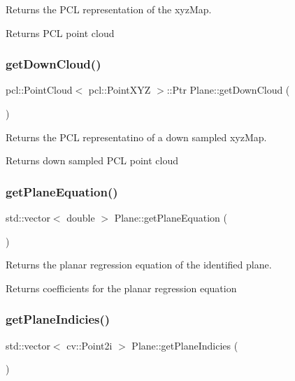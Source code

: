 Returns the P\+CL representation of the xyz\+Map. 

\begin{DoxyReturn}{Returns}
P\+CL point cloud 
\end{DoxyReturn}
\hypertarget{class_plane_abad6f7c26005ad7ab847af5acaad9c31}{}\label{class_plane_abad6f7c26005ad7ab847af5acaad9c31} 
\subsubsection{\texorpdfstring{get\+Down\+Cloud()}{getDownCloud()}}
{\footnotesize\ttfamily pcl\+::\+Point\+Cloud$<$ pcl\+::\+Point\+X\+YZ $>$\+::Ptr Plane\+::get\+Down\+Cloud (\begin{DoxyParamCaption}{ }\end{DoxyParamCaption})}



Returns the P\+CL representatino of a down sampled xyz\+Map. 

\begin{DoxyReturn}{Returns}
down sampled P\+CL point cloud 
\end{DoxyReturn}
\hypertarget{class_plane_aafedb091ba358d46d5203c4e0eb6e838}{}\label{class_plane_aafedb091ba358d46d5203c4e0eb6e838} 
\subsubsection{\texorpdfstring{get\+Plane\+Equation()}{getPlaneEquation()}}
{\footnotesize\ttfamily std\+::vector$<$ double $>$ Plane\+::get\+Plane\+Equation (\begin{DoxyParamCaption}{ }\end{DoxyParamCaption})}



Returns the planar regression equation of the identified plane. 

\begin{DoxyReturn}{Returns}
coefficients for the planar regression equation 
\end{DoxyReturn}
\hypertarget{class_plane_a843717e035e2e6b4e03a8eece14098b1}{}\label{class_plane_a843717e035e2e6b4e03a8eece14098b1} 
\subsubsection{\texorpdfstring{get\+Plane\+Indicies()}{getPlaneIndicies()}}
{\footnotesize\ttfamily std\+::vector$<$ cv\+::\+Point2i $>$ Plane\+::get\+Plane\+Indicies (\begin{DoxyParamCaption}{ }\end{DoxyParamCaption})}



